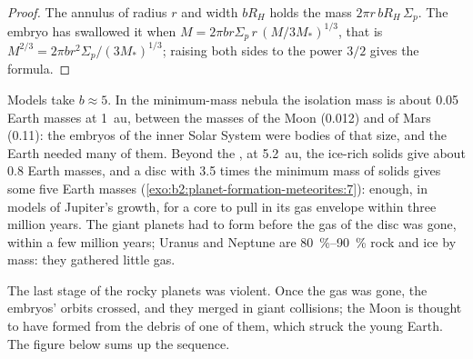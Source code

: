 \begin{proof}
The annulus of radius $r$ and width $bR_H$ holds the mass
$2\pi r\, bR_H\,\Sigma_p$. The embryo has swallowed it when
$M = 2\pi b r\Sigma_p\, r\,(M/3M_*)^{1/3}$, that is
$M^{2/3} = 2\pi b r^2\Sigma_p/(3M_*)^{1/3}$; raising both sides to the power
$3/2$ gives the formula.
\end{proof}

Models take $b \approx 5$. In the minimum-mass nebula the isolation mass is
about \num{0.05} Earth masses at \qty{1}{au}, between the masses of the
Moon (\num{0.012}) and of Mars (\num{0.11}): the embryos of the inner Solar
System were bodies of that size, and the Earth needed many of them. Beyond the , at \qty{5.2}{au}, the ice-rich solids give about
\num{0.8} Earth masses, and a disc with \num{3.5} times the minimum mass of
solids gives some five Earth masses (\cref{exo:b2:planet-formation-meteorites:7}): enough, in models of Jupiter's
growth, for a core to pull in its gas envelope within three million years. The
giant planets had to form before the gas of the disc was gone, within a few
million years; Uranus and Neptune are \qtyrange{80}{90}{\percent} rock and ice
by mass: they gathered little gas.

The last stage of the rocky planets was violent. Once the gas was gone, the
embryos' orbits crossed, and they merged in giant collisions; the Moon is
thought to have formed from the debris of one of them, which struck the young
Earth. The figure below sums up the sequence.

